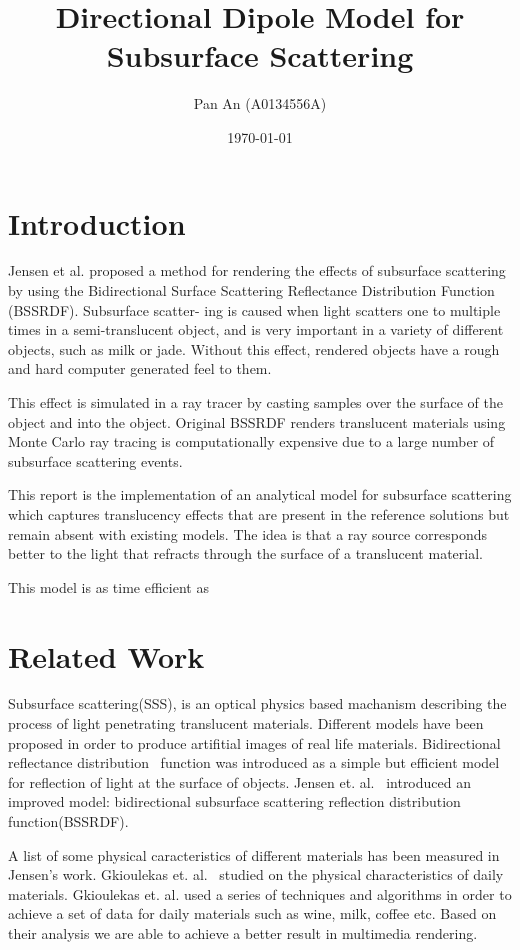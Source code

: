 \documentclass[11pt]{article}
\author{Pan An (A0134556A)}
\date{\today}
\title{Directional Dipole Model for Subsurface Scattering}
\begin{document}
\maketitle
\tableofcontents


\section{Introduction}
\label{sec:orgheadline1}
Jensen et al. proposed a method for rendering the effects of 
subsurface scattering by using the Bidirectional Surface Scattering
 Reflectance Distribution Function (BSSRDF). 
Subsurface scatter- ing is caused when light scatters one
 to multiple times in a semi-translucent object,
 and is very important in a variety of different objects, such
 as milk or jade. Without this effect, rendered objects have a 
rough and hard computer generated feel to them.


This effect is simulated in a ray tracer by casting samples over the surface
 of the object and into the object. Original BSSRDF renders translucent materials 
using Monte Carlo ray tracing is computationally expensive 
due to a large number of subsurface scattering events.

This report is the implementation of an analytical model for subsurface scattering 
which captures translucency effects that are present in the reference solutions but 
remain absent with existing models. The idea is that a ray source corresponds better to 
the light that refracts through the surface of a translucent material.

This model is as time efficient as

\section{Related Work}
\label{sec:orgheadline2}
Subsurface scattering(SSS), is an optical physics based machanism describing the
process of light penetrating translucent materials. Different models
have been proposed in order to produce artifitial images of real life
materials. Bidirectional reflectance distribution~\cite{} function was
introduced as a simple but efficient model for reflection of light at
the surface of objects. Jensen et. al.~\cite{} introduced an improved model:
bidirectional subsurface scattering reflection distribution
function(BSSRDF).

A list of some physical caracteristics of different materials  has been
measured in Jensen's work. Gkioulekas et. al.~\cite{} studied on the
physical characteristics of daily materials. Gkioulekas et. al. used a
series of techniques and algorithms in order to achieve a set of data
for daily materials such as wine, milk, coffee etc. Based on their
analysis we are able to achieve a better result in multimedia
rendering.
\end{document}
